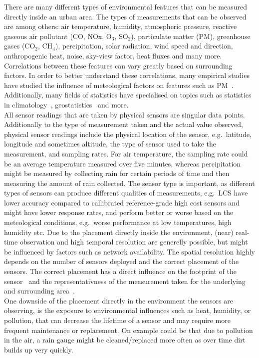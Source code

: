There are many different types of environmental features that can be measured directly inside an urban area. The types of measurements that can be observed are among others: air temperature, humidity, atmospheric pressure, reactive gaseous air pollutant (CO, NOx, O$_3$, SO$_2$), particulate matter (PM), greenhouse gases (CO$_2$, CH$_4$), percipitation, solar radiation, wind speed and direction, anthropogenic heat, noise, sky-view factor, heat fluxes and many more.
Correlations between these features can vary greatly based on surrounding factors. In order to better understand these correlations, many empirical studies have studied the influence of meteological factors on features such as PM~\cite{tai2010correlations}. Additionally, many fields of statistics have specialised on topics such as statistics in climatology~\cite{von2002statistical}, geostatistics~\cite{trangmar1986application} and more.\\
All sensor readings that are taken by physical sensors are singular data points. Additionally to the type of measurement taken and the actual value observed, physical sensor readings include the physical location of the sensor, e.g.\ latitude, longitude and sometimes altitude, the type of sensor used to take the measurement, and sampling rates. For air temperature, the sampling rate could be an average temperature measured over five minutes, whereas percipitation might be measured by collecting rain for certain periods of time and then measuring the amount of rain collected. The sensor type is important, as different types of sensors can produce different qualities of measurements, e.g.\ LCS have lower accuracy compared to callibrated reference-grade high cost sensors and might have lower response rates, and perform better or worse based on the meteological conditions, e.g.\ worse performance at low temperatures, high humidity etc. Due to the placement directly inside the environment, (near) real-time observation and high temporal resolution are generelly possible, but might be influenced by factors such as network availability. The spatial resolution highly depends on the number of sensors deployed and the correct placement of the sensors. The correct placement has a direct influence on the footprint of the sensor~\cite{leclerc2014footprints} and the representativness of the measurement taken for the underlying and surrounding area~\cite{oke2006guideline}.\\
One downside of the placement directly in the environment the sensors are observing, is the exposure to environmental influences such as heat, humidity, or pollution, that can decrease the lifetime of a sensor and may require more frequent maintenance or replacement. On example could be that due to pollution in the air, a rain gauge might be cleaned/replaced more often as over time dirt builds up very quickly.

